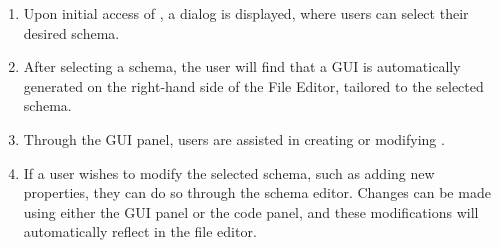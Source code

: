 \begin{enumerate}
    \item Upon initial access of \toolname{}, a dialog is displayed, where users can select their desired schema.
    \item After selecting a schema, the user will find that a GUI is automatically generated on the right-hand side of the File Editor,
    tailored to the selected schema.
    \item Through the GUI panel, users are assisted in creating or modifying \cfgfiles{}.
    \item If a user wishes to modify the selected schema, such as adding new properties, they can do so through the schema editor.
    Changes can be made using either the GUI panel or the code panel, and these modifications will automatically reflect in the file editor.
\end{enumerate}

